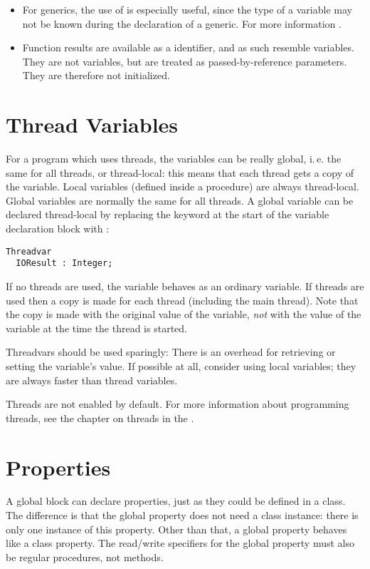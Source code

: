\begin{remark}
\begin{itemize}
\item
For generics, the use of  is especially useful, since the type of a variable may not
be known during the declaration of a generic. For more information .
\item
Function results are available as a  identifier, and as such
resemble variables. They are not variables, but are treated as passed-by-reference
parameters. They are therefore not initialized.
\end{itemize}
\end{remark}

\section{Thread Variables}
For a program which uses threads, the variables can be really global, i.\,e. the same for all
threads, or thread-local: this means that each thread gets a copy of the variable.
Local variables (defined inside a procedure) are always thread-local. Global
variables are normally the same for all threads. A global variable can be
declared thread-local by replacing the  keyword at the start of the
variable declaration block with :
\begin{verbatim}
Threadvar
  IOResult : Integer;
\end{verbatim}
If no threads are used, the variable behaves as an ordinary variable.
If threads are used then a copy is made
for each thread (including the main thread). Note that the copy is
made with the original value  of the variable, {\em not} with the
value of the variable at the time the thread is started.

Threadvars should be used sparingly: There is an overhead for retrieving
or setting the variable's value. If possible at all, consider using local
variables; they are always faster than thread variables.

Threads are not enabled by default. For more information about programming
threads, see the chapter on threads in the \progref.

\section{Properties}
A global block can declare properties, just as they could be defined in a
class. The difference is that the global property does not need a class
instance: there is only one instance of this property. Other than that, a
global property behaves like a class property. The read/write specifiers for
the global property must also be regular procedures, not methods.

